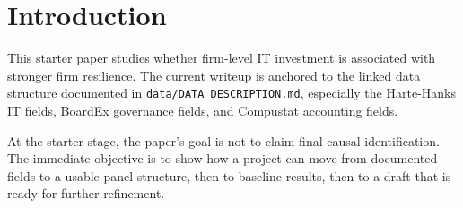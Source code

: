 \section{Introduction}

This starter paper studies whether firm-level IT investment is associated with stronger firm resilience. The current writeup is anchored to the linked data structure documented in \texttt{data/DATA\_DESCRIPTION.md}, especially the Harte-Hanks IT fields, BoardEx governance fields, and Compustat accounting fields.

At the starter stage, the paper's goal is not to claim final causal identification. The immediate objective is to show how a project can move from documented fields to a usable panel structure, then to baseline results, then to a draft that is ready for further refinement.

